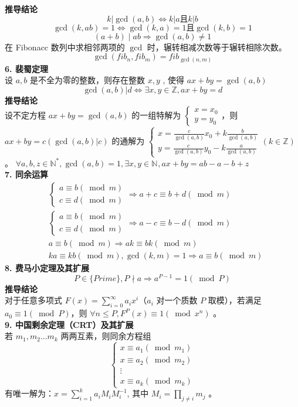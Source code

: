 \textbf{推导结论}
$$k | \gcd(a,b) \iff k|a 且 k|b$$
$$\gcd(k,ab)=1 \iff \gcd(k,a)=1 且 \gcd(k,b)=1$$
$$(a+b)\mid ab\Longrightarrow \gcd(a,b)\neq 1$$
在 Fibonacc 数列中求相邻两项的 $\gcd$ 时，辗转相减次数等于辗转相除次数。
$$\gcd\left(fib_{n},fib_{m}\right)=fib_{\gcd(n,m)}$$
\textbf{6. 裴蜀定理}\\
设 $a,b$ 是不全为零的整数，则存在整数 $x,y$ , 使得 $ax+by=\gcd(a,b)$
$$\gcd(a,b)|d \iff \exists x,y\in\mathbb{Z},ax+by=d$$
\textbf{推导结论} \\
设不定方程 $ax+by=\gcd(a,b)$ 的一组特解为 $\begin{cases}x=x_0\\ y=y_0\end{cases}$，则 $ax+by=c (\gcd(a,b)|c)$ 的通解为 $\begin{cases}x=\frac{c}{\gcd(a,b)}x_0+k\frac{b}{\gcd(a,b)}\\ y=\frac{c}{\gcd(a,b)}y_0-k\frac{a}{\gcd(a,b)}\end{cases}(k\in\mathbb{Z})$ 。
$\forall a,b,z\in\mathbb{N^{*}},\gcd(a,b)=1, \exists x,y\in\mathbb{N^{}}, ax+by=ab-a-b+z $ \\
\textbf{7. 同余运算}
$$
\begin{aligned}
&\begin{cases}a\equiv b(\bmod m)\\ c\equiv d(\bmod m)\end{cases}\Longrightarrow a+c\equiv b+d(\bmod m) \\
&\begin{cases}a\equiv b(\bmod m)\\ c\equiv d(\bmod m)\end{cases}\Longrightarrow a-c\equiv b-d(\bmod m) \\
&a\equiv b(\bmod m)\Longrightarrow ak\equiv bk(\bmod m) \\
&ka\equiv kb(\bmod m),\gcd(k,m)=1\Longrightarrow a\equiv b(\bmod m)
\end{aligned}
$$
\textbf{8. 费马小定理及其扩展}
$$P\in\{Prime\},P\nmid a\Longrightarrow a^{P-1}=1(\bmod P)$$
\textbf{推导结论}\\
对于任意多项式 $F(x)=\sum_{i=0}^{\infty}a_i x^i$（$a_i$ 对一个质数 $P$ 取模），若满足 $a_{0}\equiv 1(\bmod P)$，则 $\forall n\leqslant P,F^{P}(x)\equiv 1(\bmod x^{n})$ 。\\
\textbf{9. 中国剩余定理（CRT）及其扩展}\\
若 $m_1,m_2...m_k$ 两两互素，则同余方程组 $$\begin{cases}x\equiv a_{1}\left(\bmod m_{1}\right)\\ x\equiv a_{2}\left(\bmod m_{2}\right)\\ \vdots\\ x\equiv a_{k}\left(\bmod m_{k}\right)\end{cases}$$ 有唯一解为：$x=\sum_{i=1}^{k}a_iM_iM_i^{-1}$, 其中 $M_i=\prod_{j\neq i}m_j$ 。\\
